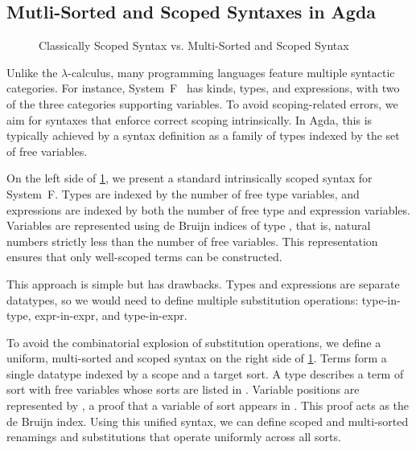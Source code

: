 \documentclass[screen,nonacm]{acmart}
\begin{document}
\subsection{Mutli-Sorted and Scoped Syntaxes in Agda}\label{sec:pre-syn}
\begin{figure}[t]
      \centering
      \begin{minipage}[t]{0.48\linewidth}
            \raggedright{}
            \EScoped{}
      \end{minipage}
      \hfill
      \begin{minipage}[t]{0.48\linewidth}
            \raggedright{}
            \EMultiSorted{}
      \end{minipage}
      \caption{Classically Scoped Syntax vs. Multi-Sorted and Scoped Syntax}\label{fig:pre-svm}
\end{figure}

Unlike the $λ$-calculus, many programming languages feature multiple syntactic
categories. For instance, System~F~\cite{girard1972} has kinds, types, and
expressions, with two of the three categories supporting variables. To avoid
scoping-related errors, we aim for syntaxes that enforce correct scoping
intrinsically. In Agda, this is typically achieved by a syntax definition as a
family of types indexed by the set of free variables.

On the left side of \cref{fig:pre-svm}, we present a standard intrinsically
scoped syntax for System~F. Types are indexed by the number of free type
variables, and expressions are indexed by both the number of free type and
expression variables. Variables are represented using de Bruijn indices of type
 , that is, natural numbers strictly less than
the number of free variables. This representation ensures that only well-scoped
terms can be constructed.

This approach is simple but has drawbacks. Types and expressions are separate
datatypes, so we would need to define multiple substitution operations:
type-in-type, expr-in-expr, and type-in-expr.

To avoid the combinatorial explosion of substitution operations, we define a
uniform, multi-sorted and scoped syntax on the right side of
\cref{fig:pre-svm}. Terms form a single datatype indexed by a scope and a
target sort. A type    describes a
term of sort  with free variables whose sorts are listed in
. Variable positions are represented by 
 , a proof that a variable of sort 
appears in . This proof acts as the de Bruijn index. Using this
unified syntax, we can define scoped and multi-sorted renamings and
substitutions that operate uniformly across all sorts.
\end{document}
